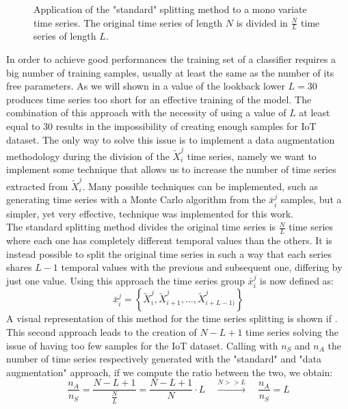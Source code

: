 \begin{figure}[h]
    \centering

\caption{Application of the "standard" splitting method to a mono variate time series. The original time series of length $N$ is divided in $\frac{N}{L}$ time series of length $L$.}
    \label{fig:ts_split_std}
\end{figure}

In order to achieve good performances the training set of a classifier requires a big number of training samples, usually at least the same as the number of its free parameters. As we will shown in  a value of the lookback lower $L=30$ produces time series too short for an effective training of the model. 
The combination of this approach with the necessity of using a value of $L$ at least equal to 30 results in the impossibility of creating enough samples for IoT dataset. The only way to solve this issue is to implement a data augmentation methodology during the division of the ${\tilde{X}_i^j}$ time series, namely we want to implement some technique that allows us to increase the number of time series extracted from ${\tilde{X}_i^j}$. Many possible techniques can be implemented, such as generating time series with a Monte Carlo algorithm from the $\bar{x}_i^j$ samples, but a simpler, yet very effective, technique was implemented for this work. \\
The standard splitting method divides the original time series is $\frac{N}{L}$ time series where each one has completely different temporal values than the others. It is instead possible to split the original time series in such a way that each series shares $L-1$ temporal values with the previous and subsequent one, differing by just one value. Using this approach the time series group $\bar{x}_i^j$
is now defined as:
\begin{equation}
    \bar{x}_i^j = \left\{\tilde{X}_{i}^j, \tilde{X}_{i +1 }^j, \dots, \tilde{X}_{i+L-1)}^j  \right\}
\end{equation}
A visual representation of this method for the time series splitting is shown if .
This second approach leads to the creation of $N-L+1$ time series solving the issue of having too few samples for the IoT dataset. Calling with $n_S$ and $n_A$ the number of time series respectively generated with the "standard" and "data augmentation" approach, if we compute the ratio between the two, we obtain:
\begin{equation}
    \frac{n_A}{n_S} = \frac{N-L+1}{\frac{N}{L}} = \frac{N-L+1}{N}\cdot L \quad \xrightarrow{N>>L}
    \quad \frac{n_A}{n_S}= L 
\end{equation}
